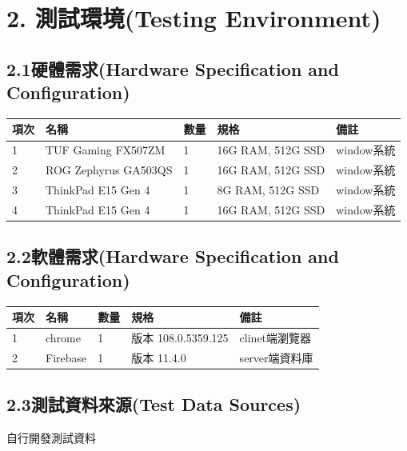 \documentclass{report}
\begin{document}
\section*{2. 測試環境(Testing Environment)}
\subsection*{2.1硬體需求(Hardware Specification and Configuration)}
\begin{tabularx}{\textwidth}{
  |p{}%
  |p{}%
  |p{}%
  |p{}%
  |p{}|%
}
  \hline
  項次 &  名稱 & 數量 & 規格  & 備註  \\ \hline
  1 & TUF Gaming FX507ZM & 1 & 16G RAM, 512G SSD & window系統  \\ \hline
  2 & ROG Zephyrus GA503QS & 1 & 16G RAM, 512G SSD & window系統  \\ \hline
  3 & ThinkPad E15 Gen 4 & 1 & 8G RAM, 512G SSD & window系統  \\ \hline
  4 & ThinkPad E15 Gen 4 & 1 & 16G RAM, 512G SSD & window系統  \\ \hline
  
\end{tabularx}

\subsection*{2.2軟體需求(Hardware Specification and Configuration)}
\begin{tabularx}{\textwidth}{ 
  |p{}%
  |p{}%
  |p{}%
  |p{}%
  |p{}|%
}
  \hline
  項次 &  名稱 & 數量 & 規格  & 備註  \\
  \hline
  1 & chrome & 1 & 版本 108.0.5359.125 & clinet端瀏覽器  \\
  \hline
  2 & Firebase & 1 & 版本 11.4.0 & server端資料庫  \\
  \hline
\end{tabularx}

\subsection*{2.3測試資料來源(Test Data Sources)}
自行開發測試資料
\end{document}
